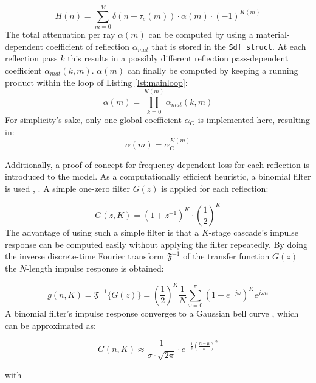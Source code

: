 \documentclass[twoside,a4paper]{article}
\begin{document}
\begin{equation}
H(n) = \sum_{m=0}^M \delta(n-\tau_s(m))\cdot \alpha(m)\cdot (-1)^{K(m)}
\end{equation}
The total attenuation per ray $\alpha(m)$ can be computed by using a material-dependent coefficient of reflection $\alpha_{mat}$ that is stored in the \texttt{Sdf struct}. At each reflection pass $k$ this results in a possibly different reflection pass-dependent coefficient $\alpha_{mat}(k,m)$. $\alpha(m)$ can finally be computed by keeping a running product within the loop of Listing \ref{lst:mainloop}:
\begin{equation}
\alpha(m)=\prod_{k=0}^{K(m)} \alpha_{mat}(k,m)
\end{equation}
For simplicity's sake, only one global coefficient $\alpha_G$ is implemented here, resulting in:
\begin{equation}
\alpha(m) = \alpha_G^{K(m)}
\end{equation}

Additionally, a proof of concept for frequency-dependent loss for each reflection is introduced to the model. As a computationally efficient heuristic, a binomial filter is used \cite{aubury_binomial_1996}, \cite{derpanis_overview_nodate}. A simple one-zero filter $G(z)$ is applied for each reflection:

\begin{equation}
G(z,K) = (1+z^{-1})^K \cdot \left(\frac{1}{2}\right)^K
\end{equation}
The advantage of using such a simple filter is that a $K$-stage cascade's impulse response can be computed easily without applying the filter repeatedly. By doing the inverse discrete-time Fourier transform $\mathfrak{F}^{-1}$ of the transfer function $G(z)$ the $N$-length impulse response is obtained:

\begin{equation}
  g(n,K) = \mathfrak{F}^{-1}\{ G(z) \} = \left(\frac{1}{2}\right)^K \frac{1}{N}  \sum_{\omega = 0}^\pi (1+e^{-j\omega})^{K} e^{j\omega n} 
\end{equation}
A binomial filter's impulse response converges to a Gaussian bell curve \cite{aubury_binomial_1996}, which can be approximated as:

\begin{equation}
G(n,K) \approx  \frac{1}{\sigma \cdot \sqrt{2 \pi}} \cdot e ^{-\frac{1}{2} (\frac{n-\mu}{\sigma})^2}
\label{eq:assump}
\end{equation}


with 
\end{document}
